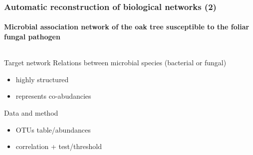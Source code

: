 \begin{frame}
  \frametitle{Automatic  reconstruction  of biological  networks  (2)}
  \framesubtitle{Microbial  association   network  of  the   oak  tree susceptible to the foliar fungal pathogen}

  \begin{columns}
    \begin{column}{.4\textwidth}
      \begin{small}
        \begin{block}{Target network}
          Relations between microbial species (bacterial or fungal)
          \begin{itemize}
          \item highly structured
          \item represents co-abudancies
          \end{itemize}
        \end{block}
      \end{small}
      \begin{small}
        \begin{block}{Data and method}
          \begin{itemize}
          \item OTUs table/abundances
          \item correlation + test/threshold
          \end{itemize}
        \end{block}
      \end{small}
    \end{column}
    \begin{column}{.55\textwidth}

\end{column}
\end{columns}
\end{frame}
